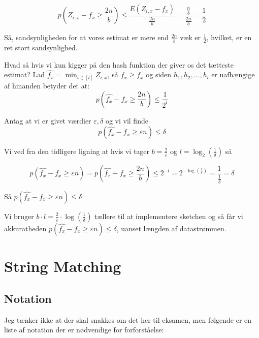 \documentclass[11pt]{article}
\theoremstyle{definition}
\theoremstyle{remark}
\begin{document}
\[
p(Z_{i,x}-f_{x} \geq \frac{2n}{b})  \leq \frac{E(Z_{i,x} - f_{x})}{\frac{2n}{b}} = \frac{\frac{n}{b}}{\frac{2n}{b}} = \frac{1}{2} 
\]

Så, sandsynligheden for at vores estimat er mere end $\frac{2n}{b}$ væk er $\frac{1}{2}$, hvilket, er en ret stort sandsynlighed.


Hvad så hvis vi kun kigger på den hash funktion der giver os det tætteste estimat? Lad $\hat{f_{x}} = \min_{i \in [l]} Z_{i,x}$, så $\hat{f_{x}} \geq f_{x}$ og siden $h_{1}, h_{2}, \ldots, h_{l}$ er uafhængige af hinanden betyder det at:
\[
p(\hat{f_{x}} - f_{x} \geq \frac{2n}{b}) \leq \frac{1}{2^{l}}
\]

Antag at vi er givet værdier $\varepsilon, \delta$ og vi vil finde
\[
p(\hat{f_{x}} - f_{x} \geq \varepsilon n) \leq \delta
\]

Vi ved fra den tidligere ligning at hvis vi tager $b = \frac{2}{\varepsilon}$ og $l = \log_{2} \left( \frac{1}{\delta} \right)$ så

\[
p(\hat{f_{x}} - f_{x} \geq \varepsilon n) = p(\hat{f_{x}} - f_{x} \geq \frac{2n}{b}) \leq 2^{-l} = 2^{-\log (\frac{1}{\delta})} = \frac{1}{\frac{1}{\delta}} = \delta
\]

Så $p(\hat{f_{x}} - f_{x} \geq \varepsilon n) \leq \delta$

Vi bruger $b \cdot l = \frac{2}{\varepsilon} \cdot \log \left( \frac{1}{\delta} \right)$ tællere til at implementere sketchen og så får vi akkuratheden $p(\hat{f_{x}} - f_{x} \geq \varepsilon n) \leq \delta$, uanset længden af datastrømmen.

\newpage

\section{String Matching}
\label{sec:string}

\subsection{Notation}
\label{subsec:stringnotation}

Jeg tænker ikke at der skal snakkes om det her til eksamen, men følgende er en liste af notation der er nødvendige for  forforståelse:
\end{document}

